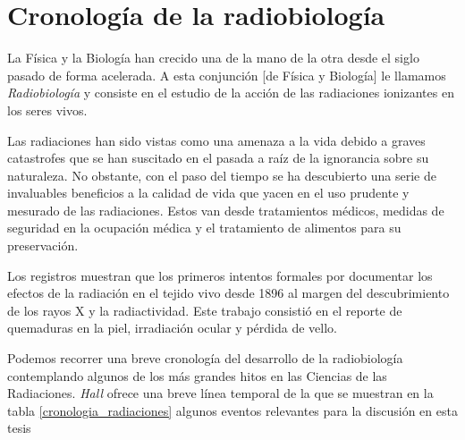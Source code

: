 \documentclass[12pt,letterpaper, oneside]{book}
\begin{document}
		\section{Cronología de la radiobiología} %
		La Física y la Biología han crecido una de la mano de la otra desde el siglo pasado de forma acelerada. A esta conjunción [de Física y Biología] le llamamos \textit{Radiobiología} y consiste en el estudio de la acción de las radiaciones ionizantes en los seres vivos\cite{Hall.2000}. 
		
		Las radiaciones han sido vistas como una amenaza a la vida debido a graves catastrofes que se han suscitado en el pasada a raíz de la ignorancia sobre su naturaleza\cite{Prasad.1995}. No obstante, con el paso del tiempo se ha descubierto una serie de invaluables beneficios a la calidad de vida que yacen en el uso prudente y mesurado de las radiaciones. Estos van desde tratamientos médicos, medidas de seguridad en la ocupación médica y el tratamiento de alimentos para su preservación\cite{Prasad.1995}. 
		
		Los registros muestran que los primeros intentos formales por documentar los efectos de la radiación en el tejido vivo desde 1896 al margen del descubrimiento de los rayos X y la radiactividad\cite{Hall.2000}. Este trabajo consistió en el reporte de quemaduras en la piel, irradiación ocular y pérdida de vello. 
		
		Podemos recorrer una breve cronología del desarrollo de la radiobiología contemplando algunos de los más grandes hitos en las Ciencias de las Radiaciones. \textit{Hall} ofrece una breve línea temporal de la que se muestran en la tabla \ref{cronologia_radiaciones} algunos eventos relevantes para la discusión en esta tesis
		
\end{document}
